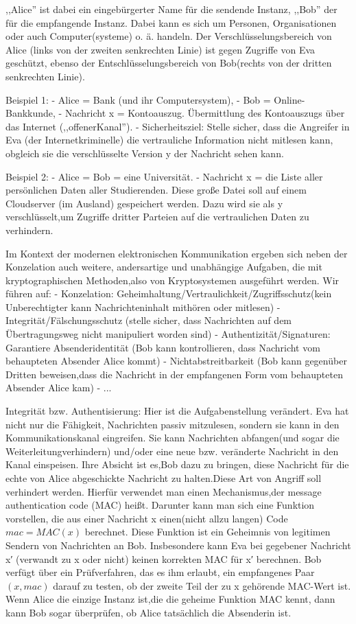 \documentclass[a4paper]{article}
\begin{document}
\begin{multicols}{3}
,,Alice''  ist dabei ein eingebürgerter Name für die sendende Instanz, ,,Bob'' der für die empfangende Instanz. Dabei kann es sich um Personen, Organisationen oder auch Computer(systeme) o. ä. handeln. Der Verschlüsselungsbereich von Alice (links von der zweiten senkrechten Linie) ist gegen Zugriffe von Eva geschützt, ebenso der Entschlüsselungsbereich von Bob(rechts von der dritten senkrechten Linie).

Beispiel 1: 
- Alice = Bank (und ihr Computersystem), 
- Bob = Online-Bankkunde, 
- Nachricht x = Kontoauszug. Übermittlung des Kontoauszugs über das Internet (,,offenerKanal'').
- Sicherheitsziel: Stelle sicher, dass die Angreifer in Eva (der Internetkriminelle) die vertrauliche Information nicht mitlesen kann, obgleich sie die verschlüsselte Version y der Nachricht sehen kann.

Beispiel 2:
- Alice = Bob = eine Universität.
- Nachricht x = die Liste aller persönlichen Daten aller Studierenden. Diese große Datei soll auf einem Cloudserver (im Ausland) gespeichert werden. Dazu wird sie als y verschlüsselt,um Zugriffe dritter Parteien auf die vertraulichen Daten zu verhindern.

Im Kontext der modernen elektronischen Kommunikation ergeben sich neben der Konzelation auch weitere, andersartige und unabhängige Aufgaben, die mit kryptographischen Methoden,also von Kryptosystemen ausgeführt werden. Wir führen auf:
- Konzelation: Geheimhaltung/Vertraulichkeit/Zugriffsschutz(kein Unberechtigter kann Nachrichteninhalt mithören oder mitlesen)
- Integrität/Fälschungsschutz (stelle sicher, dass Nachrichten auf dem Übertragungsweg nicht manipuliert worden sind)
- Authentizität/Signaturen: Garantiere Absenderidentität (Bob kann kontrollieren, dass Nachricht vom behaupteten Absender Alice kommt)
- Nichtabstreitbarkeit (Bob kann gegenüber Dritten beweisen,dass die Nachricht in der empfangenen Form vom behaupteten Absender Alice kam)
- ...

Integrität bzw. Authentisierung: Hier ist die Aufgabenstellung verändert. Eva hat nicht nur die Fähigkeit, Nachrichten passiv mitzulesen, sondern sie kann in den Kommunikationskanal eingreifen. Sie kann Nachrichten abfangen(und sogar die Weiterleitungverhindern) und/oder eine neue bzw. veränderte Nachricht in den Kanal einspeisen. Ihre Absicht ist es,Bob dazu zu bringen, diese Nachricht für die echte von Alice abgeschickte Nachricht zu halten.Diese Art von Angriff soll verhindert werden. Hierfür verwendet man einen Mechanismus,der message authentication code (MAC) heißt. Darunter kann man sich eine Funktion vorstellen, die aus einer Nachricht x einen(nicht allzu langen) Code $mac=MAC(x)$ berechnet. Diese Funktion ist ein Geheimnis von legitimen Sendern von Nachrichten an Bob. Insbesondere kann Eva bei gegebener Nachricht x′ (verwandt zu x oder nicht) keinen korrekten MAC für x′ berechnen. Bob verfügt über ein Prüfverfahren, das es ihm erlaubt, ein empfangenes Paar $(x,mac)$ darauf zu testen, ob der zweite Teil der zu x gehörende MAC-Wert ist. Wenn Alice die einzige Instanz ist,die die geheime Funktion MAC kennt, dann kann Bob sogar überprüfen, ob Alice tatsächlich die Absenderin ist.


\end{multicols}
\end{document}

